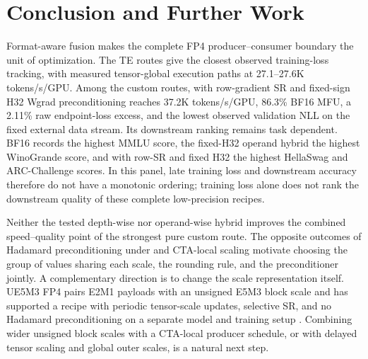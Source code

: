 \section{Conclusion and Further Work}

Format-aware fusion makes the complete FP4 producer--consumer boundary the
unit of optimization. The TE routes give the closest observed training-loss
tracking, with measured tensor-global execution paths at 27.1--27.6K
tokens/s/GPU. Among the custom routes, \mxfp{} with row-gradient SR and
fixed-sign H32 Wgrad preconditioning reaches 37.2K tokens/s/GPU, 86.3\%
BF16 MFU, a 2.11\% raw
endpoint-loss excess, and the lowest observed validation NLL on the fixed
external data stream. Its
downstream ranking remains task dependent. BF16 records the highest MMLU
score, the fixed-H32 operand hybrid the highest WinoGrande score, and
\mxfp{} with row-SR and fixed H32 the highest HellaSwag and ARC-Challenge
scores. In this panel, late training loss and downstream accuracy therefore do
not have a monotonic ordering; training loss alone does not rank the downstream
quality of these complete low-precision recipes.

Neither the tested depth-wise nor operand-wise hybrid improves the combined
speed--quality point of the strongest pure custom route. The opposite outcomes
of Hadamard preconditioning under \mxfp{} and CTA-local scaling motivate
choosing the group of values sharing each scale, the rounding rule, and the
preconditioner jointly. A complementary direction is to change the scale
representation itself. UE5M3 FP4 pairs E2M1 payloads with an unsigned E5M3
block scale and has supported a recipe with periodic tensor-scale updates,
selective SR, and no Hadamard preconditioning on a separate model and training
setup \cite{hu2026ue5m3}. Combining wider unsigned block scales with a
CTA-local producer schedule, or with delayed tensor scaling and global outer
scales, is a natural next step.
